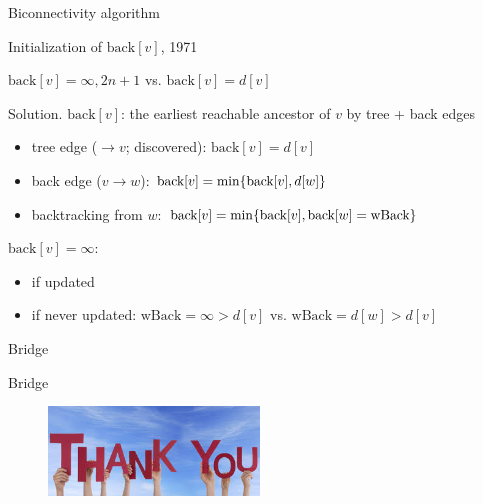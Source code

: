 \begin{frame}{Biconnectivity algorithm}
  \begin{exampleblock}{Initialization of $\text{back}[v]$, 1971 }
    \begin{center}
      $\text{back}[v] = \infty, 2n+1$ vs. $\text{back}[v] = d[v]$
    \end{center}
  \end{exampleblock}

  \begin{block}{Solution.}
    $\text{back}[v]$: the earliest reachable ancestor of $v$ by tree + back edges
    \begin{itemize}
      \item tree edge ($\to v$; discovered): $\text{back}[v] = d[v]$
      \item back edge ($v \to w$): $\text{back}[v] = \min \{\text{back}[v], d[w]\}$
      \item backtracking from $w$: $\text{back}[v] = \min \{\text{back}[v], \text{back}[w] = \text{wBack}\}$
    \end{itemize}

    $\text{back}[v] = \infty$:
    \begin{itemize}
      \item if updated
      \item if never updated: $\text{wBack} = \infty > d[v]$ vs. $\text{wBack} = d[w] > d[v]$
    \end{itemize}
  \end{block}
\end{frame}
\begin{frame}{Bridge}
  \begin{exampleblock}{Bridge }
    
  \end{exampleblock}
\end{frame}
\begin{frame}[plain]
  \begin{figure}[t]
    \centering
    \includegraphics[width = 0.50\textwidth]{figures/thankyou.jpg}
  \end{figure}
\end{frame}
